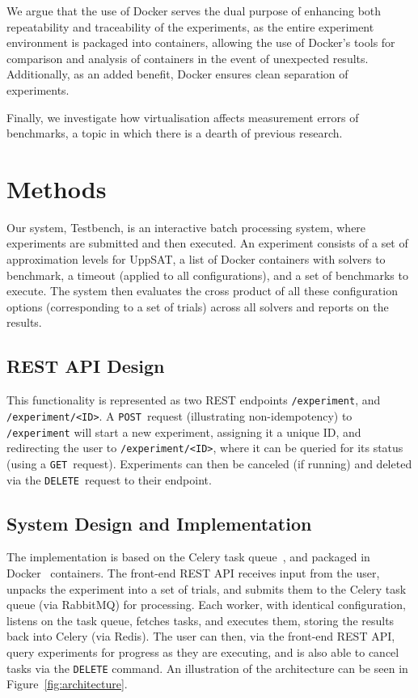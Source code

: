 \documentclass{article}
\begin{document}
\begin{multicols}{2}
We argue that the use of Docker serves the dual purpose of enhancing both
repeatability and traceability of the experiments, as the entire experiment
environment is packaged into containers, allowing the use of Docker's tools for
comparison and analysis of containers in the event of unexpected results.
Additionally, as an added benefit, Docker ensures clean separation of
experiments.

Finally, we investigate how virtualisation affects measurement errors of
benchmarks, a topic in which there is a dearth of previous research.

\section*{Methods}

Our system, Testbench, is an interactive batch processing system, where
experiments are submitted and then executed. An experiment consists of a set of
approximation levels for UppSAT, a list of Docker containers with solvers to
benchmark, a timeout (applied to all configurations), and a set of benchmarks to
execute. The system then evaluates the cross product of all these configuration
options (corresponding to a set of trials) across all solvers and reports on the
results.

\subsection*{REST API Design}

This functionality is represented as two REST endpoints \texttt{/experiment},
and \texttt{/experiment/<ID>}. A \texttt{POST}~request (illustrating
non-idempotency) to \texttt{/experiment} will start a new experiment, assigning
it a unique ID, and redirecting the user to \texttt{/experiment/<ID>}, where it
can be queried for its status (using a \texttt{GET}~request). Experiments can
then be canceled (if running) and deleted via the \texttt{DELETE}~request to
their endpoint.

\subsection*{System Design and Implementation}

The implementation is based on the Celery task queue~\cite{celery}, and packaged
in Docker~\cite{docker} containers. The front-end REST API receives input from
the user, unpacks the experiment into a set of trials, and submits them to the
Celery task queue (via RabbitMQ) for processing. Each worker, with identical
configuration, listens on the task queue, fetches tasks, and executes them,
storing the results back into Celery (via Redis). The user can then, via the
front-end REST API, query experiments for progress as they are executing, and is
also able to cancel tasks via the \texttt{DELETE} command. An illustration of
the architecture can be seen in Figure~\ref{fig:architecture}.


\end{multicols}
\end{document}
